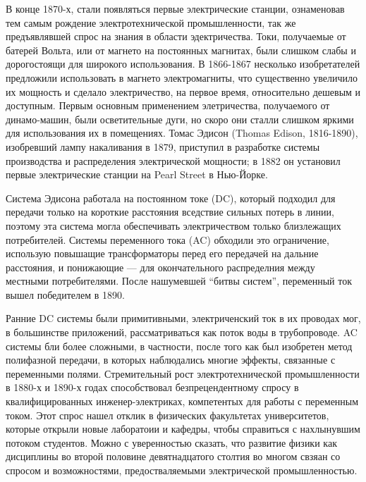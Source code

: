 \documentclass[12pt, oneside, a4paper]{article}
\begin{document}
В конце 1870-х, стали появляться первые электрические станции, ознаменовав тем самым рождение электротехнической промышленности, так же предъявлявшей спрос на знания в области эдектричества. Токи, получаемые от батерей Вольта, или от магнето на постоянных магнитах, были слишком слабы и дорогостоящи для широкого использования. В 1866-1867 несколько изобретателей предложили использовать в магнето электромагниты, что существенно увеличило их мощность и сделало электричество, на первое время, относительно дешевым и доступным. Первым основным применением элетричества, получаемого от динамо-машин, были осветительные дуги, но скоро они сталли слишком яркими для использования их в помещениях. Томас Эдисон (Thomas Edison, 1816-1890), изобревший лампу накаливания в 1879, приступил в разработке системы производства и распределения электрической мощности; в 1882 он установил первые электрические станции на Pearl Street в Нью-Йорке.

Система Эдисона работала на постоянном токе (DC), который подходил для передачи только на короткие расстояния вседствие сильных потерь в линии, поэтому эта система могла обеспечивать электричеством только близлежащих потребителей. Системы переменного тока (AC) обходили это ограничение, использую повышащие трансформаторы перед его передачей на дальние расстояния, и понижающие --- для окончательного распределния между местными потребителями. После нашумевшей ``битвы систем'', переменный ток вышел победителем в 1890.

Ранние DC системы были примитивными, электриченский ток в их проводах мог, в большинстве приложений, рассматриваться как поток воды в трубопроводе. AC системы бли более сложными, в частности, после того как был изобретен метод полифазной передачи, в которых наблюдались многие эффекты, связанные с переменными полями. Стремительный рост электротехнической промышленности в 1880-х и 1890-х годах способствовал безпрецендентному спросу в квалифицированных инженер-электриках, компетентых для работы с  переменным током. Этот спрос нашел отклик в физических факультетах университетов, которые открыли новые лаборатоии и кафедры, чтобы справиться с нахлынувшим потоком студентов. Можно с уверенностью сказать, что развитие физики как дисциплины во второй половине девятнадцатого столтия во многом свзяан со спросом и возможностями, предостваляемыми электрической промышленностью. 
\end{document}
